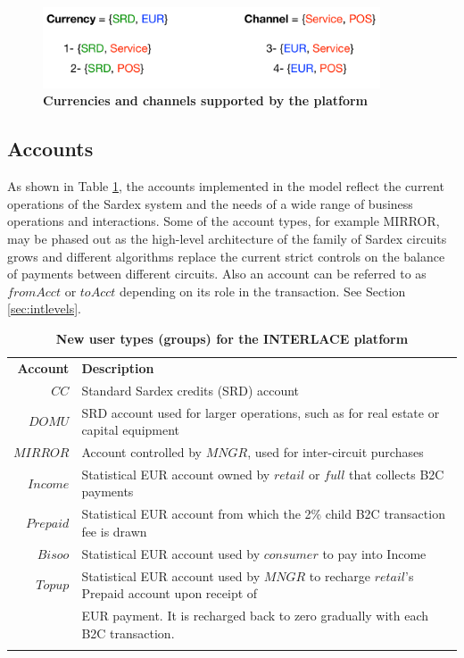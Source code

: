 \begin{figure}[h]
\vspace{-0.3cm}
\centering
\includegraphics[width=10cm]{Figures/Curr_Chan}
\caption{\small\textbf{Currencies and channels supported by the platform}}
\label{fig:currchan}
\vspace{-0.5cm}
\end{figure}

\subsection{Accounts}
As shown in Table \ref{tab:accounts}, the accounts implemented in the model reflect the current operations of the Sardex system and the needs of a wide range of business operations and interactions. Some of the account types, for example MIRROR, may be phased out as the high-level architecture of the family of Sardex circuits grows and different algorithms replace the current strict controls on the balance of payments between different circuits. Also an account can be referred to as $fromAcct$ or $toAcct$ depending on its role in the transaction. See Section \ref{sec:intlevels}.

\setlength{\tabcolsep}{10pt}
\begin{table}[htbp]
\vspace{-0.3cm}
\begin{centering}
\small
{
\begin{tabular}{ r | l  }
\hline
\textbf{Account}	& \textbf{Description} \\
\Xhline{1.5pt}
$CC$ & Standard Sardex credits (SRD) account \\
\hline
$DOMU$ & SRD account used for larger operations, such as for real estate or capital equipment\\
\hline
$MIRROR$ & Account controlled by $MNGR$, used for inter-circuit purchases \\
\hline
$Income$ & Statistical EUR account owned by $retail$ or $full$ that collects B2C payments\\
\hline
$Prepaid$ & Statistical EUR account from which the 2\% child B2C transaction fee is drawn \\
\hline
$Bisoo$ & Statistical EUR account used by $consumer$ to pay into Income \\
\hline
$Topup$ & Statistical EUR account used by $MNGR$ to recharge $retail$'s Prepaid account upon receipt of \\
&\hspace{0.5cm} EUR payment. It is recharged back to zero gradually with each B2C transaction. \\
\Xhline{1.5pt}
\end{tabular}
}
\caption{\small\textbf{New user types (groups) for the INTERLACE platform}}
\label{tab:accounts}
\end{centering}
\vspace{-0.3cm}
\end{table}

